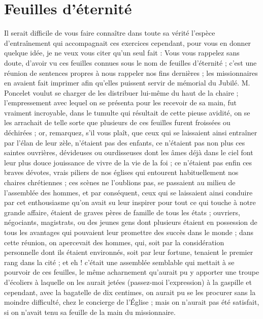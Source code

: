 \documentclass[11pt,a4paper]{report}
\begin{document}
\section*{Feuilles d'éternité}

Il serait difficile de vous faire connaître dans toute sa vérité l'espèce d'entraînement qui accompagnait ces exercices cependant, pour vous en donner quelque idée, je ne veux vous citer qu'un seul fait : Vous vous rappelez sans doute, d'avoir vu ces feuilles connues sous le nom de feuilles d'éternité ; c'est une réunion de sentences propres à nous rappeler nos fins dernières ; les missionnaires en avaient fait imprimer afin qu'elles puissent servir de mémorial du Jubilé. M. Poncelet voulut se charger de les distribuer lui-même du haut de la chaire ; l'empressement avec lequel on se présenta pour les recevoir de sa main, fut vraiment incroyable, dans le tumulte qui résultait de cette pieuse avidité, on se les arrachait de telle sorte que plusieurs de ces feuilles furent froissées ou déchirées ; or, remarquez, s'il vous plaît, que ceux qui se laissaient ainsi entraîner par l'élan de leur zèle, n'étaient pas des enfants, ce n'étaient pas non plus ces saintes ouvrières, dévideuses ou ourdisseuses dont les âmes déjà dans le ciel font leur plus douce jouissance de vivre de la vie de la foi ; ce n'étaient pas enfin ces braves dévotes, vrais piliers de nos églises qui entourent habituellement nos chaires chrétiennes ; ces scènes ne l'oublions pas, se passaient au milieu de l'assemblée des hommes, et par conséquent, ceux qui se laissaient ainsi conduire par cet enthousiasme qu'on avait su leur inspirer pour tout ce qui touche à notre grande affaire, étaient de graves pères de famille de tous les états ; ouvriers, négociants, magistrats, ou des jeunes gens dont plusieurs étaient en possession de tous les avantages qui pouvaient leur promettre des succès dans le monde ; dans cette réunion, on apercevait des hommes, qui, soit par la considération personnelle dont ils étaient environnés, soit par leur fortune, tenaient le premier rang dans la cité ; et eh ! c'était une assemblée semblable qui mettait à se pourvoir de ces feuilles, le même acharnement qu'aurait pu y apporter une troupe d'écoliers à laquelle on les aurait jetées (passez-moi l'expression) à la gaspille et cependant, avec la bagatelle de dix centimes, on aurait pu se les procurer sans la moindre difficulté, chez le concierge de l'Église ; mais on n'aurait pas été satisfait, si on n'avait tenu sa feuille de la main du missionnaire.
\end{document}
